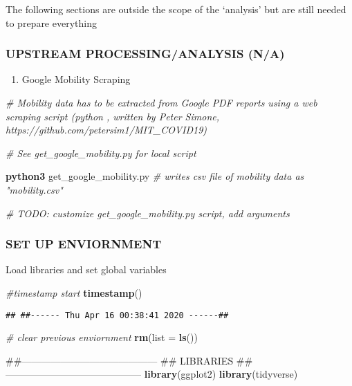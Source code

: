 \documentclass[]{article}
\newenvironment{Shaded}{\begin{snugshade}}{\end{snugshade}}
\newcommand{\KeywordTok}[1]{\textcolor[rgb]{0.13,0.29,0.53}{\textbf{{#1}}}}
\newcommand{\DataTypeTok}[1]{\textcolor[rgb]{0.13,0.29,0.53}{{#1}}}
\newcommand{\CommentTok}[1]{\textcolor[rgb]{0.56,0.35,0.01}{\textit{{#1}}}}
\newcommand{\NormalTok}[1]{{#1}}
\providecommand{\tightlist}{%
  \setlength{\itemsep}{0pt}\setlength{\parskip}{0pt}}
\begin{document}
The following sections are outside the scope of the `analysis' but are
still needed to prepare everything

\subsubsection{UPSTREAM PROCESSING/ANALYSIS
(N/A)}\label{upstream-processinganalysis-na}

\begin{enumerate}
\def\labelenumi{\arabic{enumi}.}
\tightlist
\item
  Google Mobility Scraping
\end{enumerate}

\begin{Shaded}
\begin{Highlighting}[]
\CommentTok{# Mobility data has to be extracted from Google PDF reports using a web scraping script (python , written by Peter Simone, https://github.com/petersim1/MIT_COVID19)}

\CommentTok{# See get_google_mobility.py for local script }

\KeywordTok{python3} \NormalTok{get_google_mobility.py}
\CommentTok{# writes csv file of mobility data as "mobility.csv"}

\CommentTok{# TODO: customize get_google_mobility.py script, add arguments}
\end{Highlighting}
\end{Shaded}

\subsubsection{SET UP ENVIORNMENT}\label{set-up-enviornment}

Load libraries and set global variables

\begin{Shaded}
\begin{Highlighting}[]
\CommentTok{#timestamp start}
\KeywordTok{timestamp}\NormalTok{()}
\end{Highlighting}
\end{Shaded}

\begin{verbatim}
## ##------ Thu Apr 16 00:38:41 2020 ------##
\end{verbatim}

\begin{Shaded}
\begin{Highlighting}[]
\CommentTok{# clear previous enviornment}
\KeywordTok{rm}\NormalTok{(}\DataTypeTok{list =} \KeywordTok{ls}\NormalTok{())}

\NormalTok{##------------------------------------------}
\NormalTok{## LIBRARIES}
\NormalTok{##------------------------------------------}
\KeywordTok{library}\NormalTok{(ggplot2)}
\KeywordTok{library}\NormalTok{(tidyverse)}
\end{Highlighting}
\end{Shaded}
\end{document}
